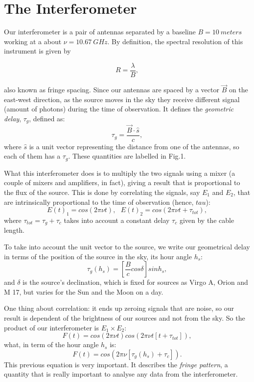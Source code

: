 \documentclass{article}
\begin{document}
\section{The Interferometer}

Our interferometer is a pair of antennas separated by a baseline $B = 10
\ meters$ working at a about $\nu = 10.67 \ GHz$. By definition, the spectral
resolution of this instrument is given by

\begin{equation}
R = \frac{\lambda}{B},
\label{eq:spec_res}
\end{equation} 

also known as fringe spacing. Since our antennas are spaced by a vector $\vec{B}$ on
the east-west direction, as the source moves in the sky they receive
different signal (amount of photons) during the time of
observation. It defines the \emph{geometric delay}, $\tau_{g}$, defined as:
\begin{equation}
\tau_{g} = \frac{\vec{B} \cdot \hat{s}}{c},
\label{eq:tau}
\end{equation}  
where $\hat{s}$ is a unit vector representing the distance from one of
the antennas, so each of them has a $\tau_{g}$. These quantities are
labelled in Fig.1. 

What this interferometer does is to multiply the two
signals using a mixer (a couple of mixers and amplifiers, in fact),
giving a result that is proportional to the flux of the source. This is
done by correlating the signals, say $E_{1}$ and $E_{2}$, that are
intrinsically proportional to the time of observation (hence, $tau$):
\begin{equation}
E(t)_{1} = cos(2 \pi \nu t), \text{ } E(t)_{2} = cos(2 \pi \nu t + \tau_{tot}),
\label{eq:ampl}
\end{equation} 
where $\tau_{tot} = \tau_{g} + \tau_{c}$ takes into account a constant delay
$\tau_{c}$ given by the cable length.

To take into account the unit vector to the source, we write our
geometrical delay in terms of the position of the source in the sky, its
hour angle $h_{s}$:
\begin{equation}
\tau_{g}(h_{s})=\left[\frac{B}{c}cos\delta \right]sinh_{s},
\label{eq:tau_ha}
\end{equation} 
and $\delta$ is the source's declination, which is fixed for sources as
Virgo A, Orion and M 17, but varies for the Sun and the Moon on a day. 

One thing about correlation: it ends up zeroing signals that are noise,
so our result is dependent of the brightness of our sources and not from
the sky. So the product of our interferometer is $E_{1} \times E_{2}$:
\begin{equation}
F(t) = cos(2 \pi \nu t)cos(2 \pi \nu t[t+ \tau_{tot}]),
\label{eq:imp}
\end{equation} 
what, in term of the hour angle $h_{s}$ is:
\begin{equation}
F(t) = cos(2 \pi \nu[\tau_{g}(h_{s}) + \tau_{c}]).
\label{eq:very_imp}
\end{equation} 
This previous equation is very important. It describes the \emph{fringe
  pattern}, a quantity that is really important to analyse any data from
the interferometer. 
\end{document}
